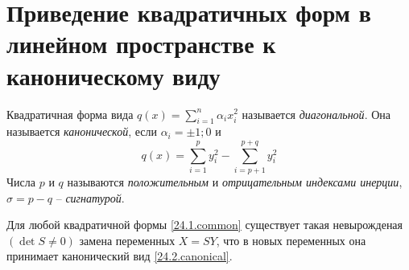   \section{Приведение квадратичных форм в линейном пространстве к каноническому виду}
  \begin{defn}
  Квадратичная форма вида $q(x)=\sum\limits_{i=1}^n\alpha_ix_i^2$ называется \textit{диагональной}. Она называется \textit{канонической}, если $\alpha_i=\pm 1;0$ и 
  \begin{equation}\label{24.2.canonical}
  q(x)=\sum\limits_{i=1}^py_i^2-\sum\limits_{i=p+1}^{p+q}y_i^2
  \end{equation} 
  Числа $p$ и $q$ называются \textit{положительным} и \textit{отрицательным индексами инерции}, $\sigma=p-q$ -- \textit{сигнатурой}.
  \end{defn}
  \begin{thm}
  Для любой квадратичной формы \ref{24.1.common} существует такая невырожденая $(\det S \neq 0)$ замена переменных $X=SY$, что в новых переменных она принимает канонический вид \ref{24.2.canonical}.
  \end{thm}

